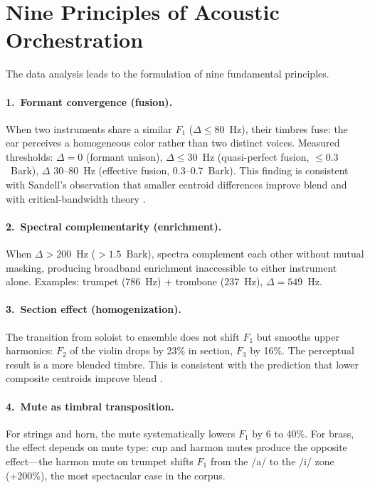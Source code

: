 \documentclass[12pt,a4paper]{article}
\begin{document}
\section{Nine Principles of Acoustic Orchestration}
\label{sec:principles}

The data analysis leads to the formulation of nine fundamental principles.

\paragraph{1.\ Formant convergence (fusion).}
When two instruments share a similar $F_1$ ($\Delta \leq 80$~Hz), their
timbres fuse: the ear perceives a homogeneous color rather than two distinct
voices. Measured thresholds: $\Delta = 0$ (formant unison), $\Delta \leq 30$~Hz
(quasi-perfect fusion, $\leq 0.3$~Bark), $\Delta$ 30--80~Hz (effective fusion,
0.3--0.7~Bark). This finding is consistent with Sandell's observation that
smaller centroid differences improve blend \citep{Sandell1995} and with
critical-bandwidth theory \citep{Zwicker1961}.

\paragraph{2.\ Spectral complementarity (enrichment).}
When $\Delta > 200$~Hz ($> 1.5$~Bark), spectra complement each other without
mutual masking, producing broadband enrichment inaccessible to either instrument
alone. Examples: trumpet (786~Hz) + trombone (237~Hz), $\Delta = 549$~Hz.

\paragraph{3.\ Section effect (homogenization).}
The transition from soloist to ensemble does not shift $F_1$ but smooths upper
harmonics: $F_2$ of the violin drops by 23\% in section, $F_3$ by 16\%. The
perceptual result is a more blended timbre. This is consistent with the
prediction that lower composite centroids improve blend \citep{Sandell1995}.

\paragraph{4.\ Mute as timbral transposition.}
For strings and horn, the mute systematically lowers $F_1$ by 6 to 40\%. For
brass, the effect depends on mute type: cup and harmon mutes produce the
opposite effect---the harmon mute on trumpet shifts $F_1$ from the /a/ to the
/i/ zone (+200\%), the most spectacular case in the corpus.
\end{document}
